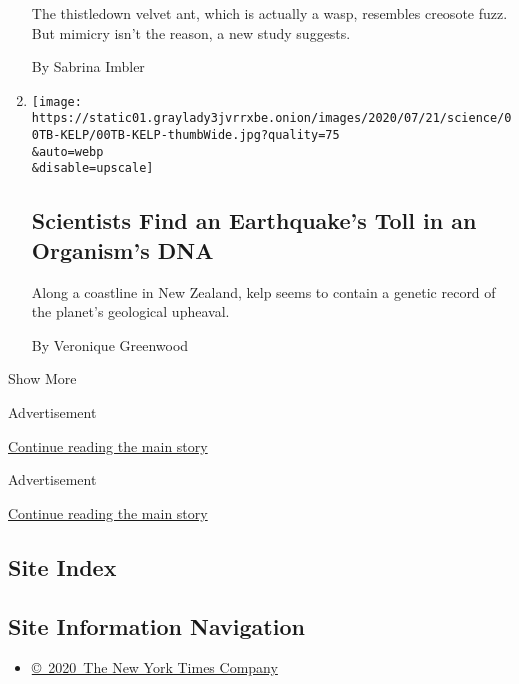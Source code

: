 \begin{enumerate}
  The thistledown velvet ant, which is actually a wasp, resembles
  creosote fuzz. But mimicry isn't the reason, a new study suggests.

  By Sabrina Imbler
\item
  \href{/2020/07/14/science/earthquake-dna-genes-kelp.html}{}

  \texttt{[image: https://static01.graylady3jvrrxbe.onion/images/2020/07/21/science/00TB-KELP/00TB-KELP-thumbWide.jpg?quality=75\\\&auto=webp\\\&disable=upscale]}

  \hypertarget{scientists-find-an-earthquakes-toll-in-an-organisms-dna}{%
  \subsection{Scientists Find an Earthquake's Toll in an Organism's
  DNA}\label{scientists-find-an-earthquakes-toll-in-an-organisms-dna}}

  Along a coastline in New Zealand, kelp seems to contain a genetic
  record of the planet's geological upheaval.

  By Veronique Greenwood
\end{enumerate}

Show More

Advertisement

\protect\hyperlink{after-mid1}{Continue reading the main story}

Advertisement

\protect\hyperlink{after-mktg}{Continue reading the main story}

\hypertarget{site-index}{%
\subsection{Site Index}\label{site-index}}

\hypertarget{site-information-navigation}{%
\subsection{Site Information
Navigation}\label{site-information-navigation}}

\begin{itemize}
\tightlist
\item
  \href{https://help.nytimes3xbfgragh.onion/hc/en-us/articles/115014792127-Copyright-notice}{©~2020~The
  New York Times Company}
\end{itemize}


